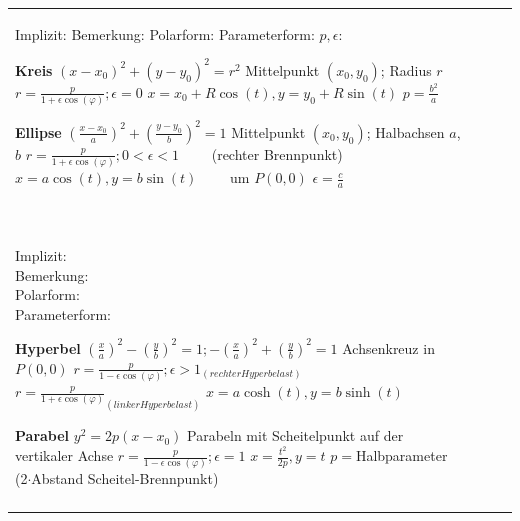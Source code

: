 \begin{tabular}{llll}
\parbox{2.7cm}{
\textbf{ } \\
Implizit:\\
Bemerkung:\\
Polarform:\\
Parameterform:\\
$p, \epsilon$:
}

\parbox{6cm}{
\textbf{Kreis}\\
$(x-x_0)^2 + (y - y_0)^2 = r^2$\\
Mittelpunkt $(x_0, y_0)$; Radius $r$\\
$r = \frac{p}{1 + \epsilon \cos(\varphi)}; \epsilon = 0$\\
$x=x_0 + R\cos(t), y=y_0 + R\sin(t) $ \\
$ p = \frac{b^2}{a}$
} 

\parbox{8cm}{
\textbf{Ellipse}\\
$(\frac{x-x_0}{a})^2 + (\frac{y-y_0}{b})^2 = 1$\\
Mittelpunkt $(x_0, y_0)$; Halbachsen $a$, $b$\\
$r = \frac{p}{1 + \epsilon \cos(\varphi)}; 0 < \epsilon < 1 \qquad$ (rechter Brennpunkt)\\
$x = a\cos(t), y = b\sin(t) \qquad$ um $P(0,0)$ \\
$\epsilon = \frac{c}{a}$
}\\ \\


\parbox{2.7cm}{
\textbf {}\\
Implizit:\\
Bemerkung:\\
Polarform:\\
Parameterform:
}

\parbox{6cm}{
\textbf{Hyperbel}\\ 
$(\frac{x}{a})^2 - (\frac{y}{b})^2 = 1; -(\frac{x}{a})^2 + (\frac{y}{b})^2 =1$\\ 
Achsenkreuz in $P(0,0)$\\
$r = \frac{p}{1 - \epsilon \cos(\varphi)}; \epsilon > 1_{(rechter Hyperbelast)}$\\
$r = \frac{p}{1 + \epsilon \cos(\varphi)}_{(linker Hyperbelast)}$ \\
$x= a \cosh(t), y = b \sinh(t) $ 

}

\parbox{8cm}{
\textbf{Parabel}\\
$y^2 = 2p(x-x_0)$\\
Parabeln mit Scheitelpunkt auf der vertikaler Achse\\
$r = \frac{p}{1 - \epsilon \cos(\varphi)}; \epsilon = 1$\\
$x= \frac{t^2}{2p}, y = t$\\
$p=$Halbparameter (2$\cdot$Abstand Scheitel-Brennpunkt)
}\\ \\


\end{tabular}
